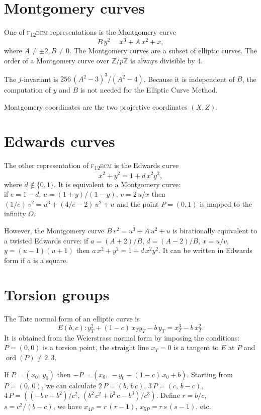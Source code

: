 \documentclass[a4paper, 11pt, pdftex]{report}
\theoremstyle{plain}
\theoremstyle{definition}
\DeclareMathOperator{\ord}{ord}
\begin{document}
\section{Montgomery curves}

One of {\scshape f\textsubscript{12}ecm} representations is the Montgomery curve
$$B\,y^2 = x^3 + A\,x^2 + x,$$
where $A \neq \pm2, B \neq 0$. 
The Montgomery curves are a subset of elliptic curves. The order of a Montgomery curve over
$\mathbb{Z}/p\mathbb{Z}$ is always divisible by 4.

The $j$-invariant is $256\,(A^2 - 3)^3 / (A^2 - 4)$. Because it is independent of $B$,
the computation of $y$ and $B$ is not needed for the Elliptic Curve Method.

Montgomery coordinates are the two projective coordinates $(X, Z)$.

\section{Edwards curves}

The other representation of {\scshape f\textsubscript{12}ecm} is the Edwards curve
$$x^2 + y^2 = 1 + d\,x^2y^2,$$
where $d \not\in \{0, 1\}$. It is equivalent to a Montgomery curve:\\
if $e = 1 - d$, $u = (1 + y)/(1 - y)$, $v = 2\,u / x$ then $(1/e)\,v^2 = u^3 + (4/e - 2)\,u^2 + u$
and the point $P = (0, 1)$ is mapped to the infinity $O$.

However, the Montgomery curve $B\,v^2 = u^3 + A\,u^2 + u$ is birationally equivalent to a
twisted Edwards curve:
if $a = (A + 2) / B$, $d = (A - 2) / B$, $x = u / v$, $y = (u - 1)(u + 1)$ then
$a\,x^2 + y^2 = 1 + d\,x^2y^2$. It can be written in Edwards form if $a$ is a square.

\section{Torsion groups}

The Tate normal form of an elliptic curve is
$$E(b, c): y_T^2 + (1 - c)\, x_T y_T - b\,y_T = x_T^3 -  b\, x_T^2.$$
It is  obtained from the  Weierstrass normal form by  imposing the conditions: $P = (0, 0)$ is a
torsion point, the straight line $x_T = 0$ is a tangent to $E$ at $P$ and $\ord(P)\neq 2 ,3$.

If $P = (x_0,\, y_0)$ then $-P = (x_0,\, -y_0 - (1 - c)\, x_0 + b)$.
Starting from $P = (0,\, 0)$, we can calculate
$2\,P = \left(b,\, b\,c\right)$, $3\,P = \left(c,\, b - c\right)$,
$4\,P = \left((-b\,c + b^2)/c^2,\, (b^2\,c^2 + b^2\,c - b^3)/c^3\right)$. Define $r = b/c$,
$s = c^2/(b - c)$, we have $x_{4P} = r\,(r - 1)$, $x_{5P} = r\,s\,(s - 1)$, etc.
\end{document}
